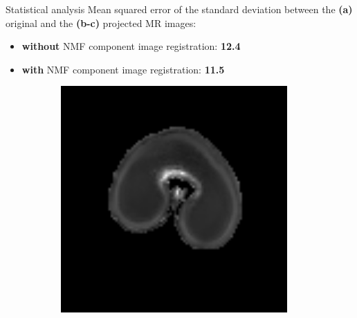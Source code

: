 \documentclass[10pt]{beamer}
\begin{document}
\begin{frame}{Statistical analysis}
  Mean squared error of the standard deviation between the \textbf{(a)} original and the \textbf{(b-c)} projected MR images:
  \begin{itemize}
  \item \textbf{without} NMF component image registration: \textbf{12.4}
  \item \textbf{with} NMF component image registration: \textbf{11.5}
  \end{itemize}

    \begin{figure}[ht]
  \centering
  \begin{subfigure}[t]{0.3\textwidth}
    \centering
    \includegraphics[width=0.95\textwidth]{fig/t2_6_original}
    \caption{}
    \label{subfig:t2_6_original}
  \end{subfigure}%
  \begin{subfigure}[t]{0.3\textwidth}
    \centering

\end{subfigure}
\end{figure}
\end{frame}
\end{document}
